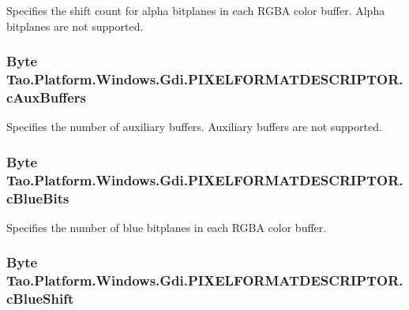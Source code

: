 Specifies the shift count for alpha bitplanes in each RGBA color buffer. Alpha bitplanes are not supported. 

\hypertarget{struct_tao_1_1_platform_1_1_windows_1_1_gdi_1_1_p_i_x_e_l_f_o_r_m_a_t_d_e_s_c_r_i_p_t_o_r_ac1d139bcff3eddaef2b43bc8b94d507a}{
\subsubsection[{cAuxBuffers}]{\setlength{\rightskip}{0pt plus 5cm}Byte {\bf Tao.Platform.Windows.Gdi.PIXELFORMATDESCRIPTOR.cAuxBuffers}}}
\label{struct_tao_1_1_platform_1_1_windows_1_1_gdi_1_1_p_i_x_e_l_f_o_r_m_a_t_d_e_s_c_r_i_p_t_o_r_ac1d139bcff3eddaef2b43bc8b94d507a}


Specifies the number of auxiliary buffers. Auxiliary buffers are not supported. 

\hypertarget{struct_tao_1_1_platform_1_1_windows_1_1_gdi_1_1_p_i_x_e_l_f_o_r_m_a_t_d_e_s_c_r_i_p_t_o_r_a77e9803e55cb7e08b6aec0af6d2620ba}{
\subsubsection[{cBlueBits}]{\setlength{\rightskip}{0pt plus 5cm}Byte {\bf Tao.Platform.Windows.Gdi.PIXELFORMATDESCRIPTOR.cBlueBits}}}
\label{struct_tao_1_1_platform_1_1_windows_1_1_gdi_1_1_p_i_x_e_l_f_o_r_m_a_t_d_e_s_c_r_i_p_t_o_r_a77e9803e55cb7e08b6aec0af6d2620ba}


Specifies the number of blue bitplanes in each RGBA color buffer. 

\hypertarget{struct_tao_1_1_platform_1_1_windows_1_1_gdi_1_1_p_i_x_e_l_f_o_r_m_a_t_d_e_s_c_r_i_p_t_o_r_a3731caf144f9cf5935d36f8a75a47dc3}{
\subsubsection[{cBlueShift}]{\setlength{\rightskip}{0pt plus 5cm}Byte {\bf Tao.Platform.Windows.Gdi.PIXELFORMATDESCRIPTOR.cBlueShift}}}
\label{struct_tao_1_1_platform_1_1_windows_1_1_gdi_1_1_p_i_x_e_l_f_o_r_m_a_t_d_e_s_c_r_i_p_t_o_r_a3731caf144f9cf5935d36f8a75a47dc3}


